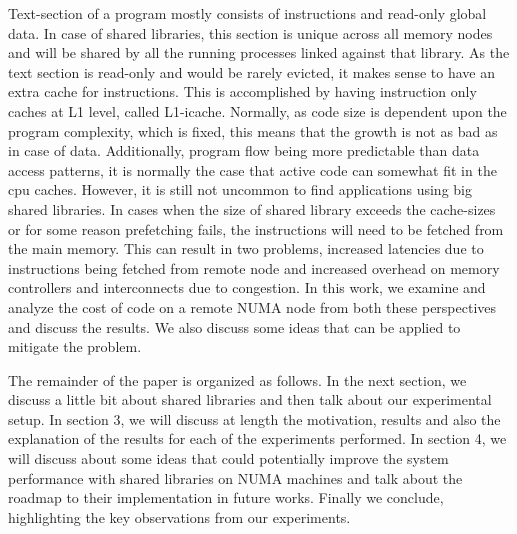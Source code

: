 Text-section of a program mostly consists of instructions and read-only global data. In case of shared libraries, this section
is unique across all memory nodes and will be shared by all the running processes linked against that library. As the text
section is read-only and would be rarely evicted, it makes sense to have an extra cache for instructions. This is accomplished
by having instruction only caches at L1 level, called L1-icache. Normally, as code size is dependent upon the program complexity,
which is fixed, this means that the growth is not as bad as in case of data. Additionally, program flow being more predictable
than data access patterns, it is normally the case that active code can somewhat fit in the cpu caches.
However, it is still not uncommon to find applications using big shared libraries. In cases when the size of shared library exceeds
the cache-sizes or for some reason prefetching fails, the instructions will need to be fetched from the main memory.
This can result in two problems, increased latencies due to instructions being fetched from remote node and increased overhead on
memory controllers and interconnects due to congestion. In this work, we examine and analyze the cost of code on a remote NUMA
node from both these perspectives and discuss the results. We also discuss some ideas that can be applied to mitigate the problem.

The remainder of the paper is organized as follows. In the next section, we discuss a little bit about shared libraries and 
then talk about our experimental setup. In section 3, we will discuss at length the motivation, results and also the explanation
of the results for each of the experiments performed. In section 4, we will discuss about some ideas that could potentially improve
the system performance with shared libraries on NUMA machines and talk about the roadmap to their implementation in future works.
Finally we conclude, highlighting the key observations from our experiments.

